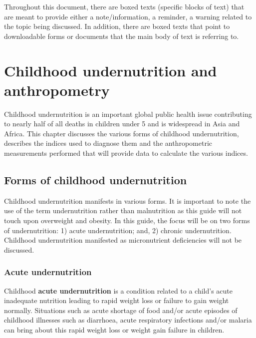 \documentclass[
  12pt,
]{book}
\begin{document}
Throughout this document, there are boxed texts (specific blocks of text) that are meant to provide either a note/information, a reminder, a warning related to the topic being discussed. In addition, there are boxed texts that point to downloadable forms or documents that the main body of text is referring to.

\hypertarget{anthro}{%
\chapter{Childhood undernutrition and anthropometry}\label{anthro}}

Childhood undernutrition is an important global public health issue contributing to nearly half of all deaths in children under 5 and is widespread in Asia and Africa. This chapter discusses the various forms of childhood undernutrition, describes the indices used to diagnose them and the anthropometric measurements performed that will provide data to calculate the various indices.

\hypertarget{forms-of-childhood-undernutrition}{%
\section{Forms of childhood undernutrition}\label{forms-of-childhood-undernutrition}}

Childhood undernutrition manifests in various forms. It is important to note the use of the term undernutrition rather than malnutrition as this guide will not touch upon overweight and obesity. In this guide, the focus will be on two forms of undernutrition: 1) acute undernutrition; and, 2) chronic undernutrition. Childhood undernutrition manifested as micronutrient deficiencies will not be discussed.

\hypertarget{acute-undernutrition}{%
\subsection{Acute undernutrition}\label{acute-undernutrition}}

Childhood \textbf{acute undernutrition} is a condition related to a child's acute inadequate nutrition leading to rapid weight loss or failure to gain weight normally. Situations such as acute shortage of food and/or acute episodes of childhood illnesses such as diarrhoea, acute respiratory infections and/or malaria can bring about this rapid weight loss or weight gain failure in children.

\newpage
\end{document}
